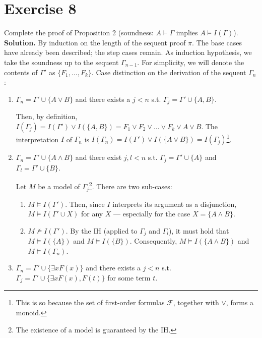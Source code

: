 \section{Exercise 8}

Complete the proof of Proposition 2 (soundness: $A \vdash \Gamma$ implies $A \models I(\Gamma)$).\\

\noindent
\textbf{Solution.} By induction on the length of the sequent proof $\pi$. The base cases have already been described; the step cases remain. As induction hypothesis, we take the soundness up to the sequent $\Gamma_{n-1}$. For simplicity, we will denote the contents of $\Gamma'$ as $\{F_1,\dots,F_k\}$. Case distinction on the derivation of the sequent $\Gamma_n$:

\begin{enumerate}
	\item $\Gamma_n = \Gamma' \cup \{A \vee B\}$ and there exists a $j < n$ s.t. $\Gamma_j = \Gamma' \cup \{A,B\}$.
	
	Then, by definition, $I(\Gamma_j) = I(\Gamma') \vee I(\{A,B\}) = F_1 \vee F_2 \vee \dots \vee F_k \vee A \vee B$. The interpretation $I$ of $\Gamma_n$ is $I(\Gamma_n) = I(\Gamma') \vee I(\{A \vee B\}) = I(\Gamma_j)$\footnote{This is so because the set of first-order formulas $\mathcal{F}$, together with $\vee$, forms a monoid.}.
	
	\item $\Gamma_n = \Gamma' \cup \{A \wedge B\}$ and there exist $j,l < n$ s.t. $\Gamma_j = \Gamma' \cup \{A\}$ and $\Gamma_l = \Gamma' \cup \{B\}$.
	
	Let $M$ be a model of $\Gamma_j$\footnote{The existence of a model is guaranteed by the IH.}. There are two sub-cases:
	
	\begin{enumerate}
		\item $M \models I(\Gamma')$. Then, since $I$ interprets its argument as a disjunction, $M \models I(\Gamma' \cup X)$ for any $X$ --- especially for the case $X = \{A \wedge B\}$.
		
		\item $M \not\models I(\Gamma')$. By the IH (applied to $\Gamma_j$ and $\Gamma_l$), it must hold that $M \models I(\{A\})$ and $M \models I(\{B\})$. Consequently, $M \models I(\{A \wedge B\})$ and $M \models I(\Gamma_n)$.
	\end{enumerate}
	
	\item $\Gamma_n = \Gamma' \cup \{\exists x F(x)\}$ and there exists a $j < n$ s.t. $\Gamma_j = \Gamma' \cup \{\exists x F(x), F(t)\}$ for some term $t$.
	

\end{enumerate}
